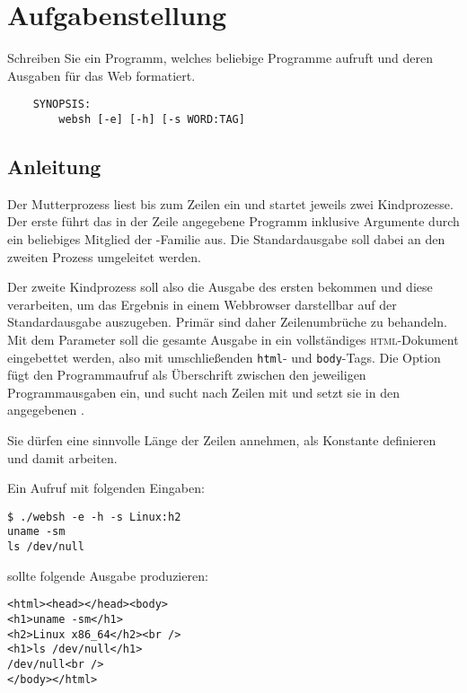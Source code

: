 




\section*{Aufgabenstellung}

Schreiben Sie ein Programm, welches beliebige Programme aufruft und
deren Ausgaben für das Web formatiert.

\begin{verbatim}
    SYNOPSIS:
        websh [-e] [-h] [-s WORD:TAG]
\end{verbatim}

\subsection*{Anleitung}

Der Mutterprozess liest bis zum  Zeilen ein und startet
jeweils zwei Kindprozesse. Der erste führt das in der Zeile angegebene
Programm inklusive Argumente durch ein beliebiges Mitglied der
-Familie aus. Die Standardausgabe soll dabei an den zweiten
Prozess umgeleitet werden.

Der zweite Kindprozess soll also die Ausgabe des ersten bekommen und
diese verarbeiten, um das Ergebnis in einem Webbrowser darstellbar auf
der Standardausgabe auszugeben. Primär sind daher Zeilenumbrüche zu
behandeln. Mit dem Parameter  soll die gesamte Ausgabe in ein
vollständiges \textsc{html}-Dokument eingebettet werden, also mit
umschließenden \verb_html_- und \verb_body_-Tags. Die Option 
fügt den Programmaufruf als Überschrift zwischen den jeweiligen
Programmausgaben ein, und  sucht nach Zeilen mit 
und setzt sie in den angegebenen .

Sie dürfen eine sinnvolle Länge der Zeilen annehmen, als Konstante
definieren und damit arbeiten.

Ein Aufruf mit folgenden Eingaben:

\begin{verbatim}
$ ./websh -e -h -s Linux:h2
uname -sm
ls /dev/null
\end{verbatim}

sollte folgende Ausgabe produzieren:

\begin{verbatim}
<html><head></head><body>
<h1>uname -sm</h1>
<h2>Linux x86_64</h2><br />
<h1>ls /dev/null</h1>
/dev/null<br />
</body></html>
\end{verbatim}

\osueguidelinestwo


